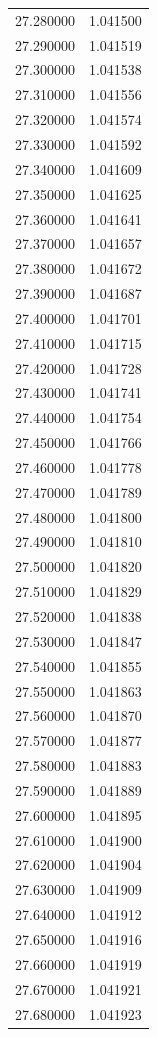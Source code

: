 \begin{tabular}{rr}
27.280000 & 1.041500 \\
27.290000 & 1.041519 \\
27.300000 & 1.041538 \\
27.310000 & 1.041556 \\
27.320000 & 1.041574 \\
27.330000 & 1.041592 \\
27.340000 & 1.041609 \\
27.350000 & 1.041625 \\
27.360000 & 1.041641 \\
27.370000 & 1.041657 \\
27.380000 & 1.041672 \\
27.390000 & 1.041687 \\
27.400000 & 1.041701 \\
27.410000 & 1.041715 \\
27.420000 & 1.041728 \\
27.430000 & 1.041741 \\
27.440000 & 1.041754 \\
27.450000 & 1.041766 \\
27.460000 & 1.041778 \\
27.470000 & 1.041789 \\
27.480000 & 1.041800 \\
27.490000 & 1.041810 \\
27.500000 & 1.041820 \\
27.510000 & 1.041829 \\
27.520000 & 1.041838 \\
27.530000 & 1.041847 \\
27.540000 & 1.041855 \\
27.550000 & 1.041863 \\
27.560000 & 1.041870 \\
27.570000 & 1.041877 \\
27.580000 & 1.041883 \\
27.590000 & 1.041889 \\
27.600000 & 1.041895 \\
27.610000 & 1.041900 \\
27.620000 & 1.041904 \\
27.630000 & 1.041909 \\
27.640000 & 1.041912 \\
27.650000 & 1.041916 \\
27.660000 & 1.041919 \\
27.670000 & 1.041921 \\
27.680000 & 1.041923 \\

\end{tabular}
